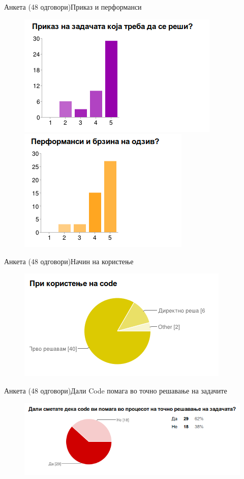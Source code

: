 \begin{frame}{Анкета (48 одговори)}{Приказ и перформанси}
\begin{figure}
    \centering
        \includegraphics[width=.45\textwidth]{images/responses/prikaz}
        \includegraphics[width=.45\textwidth]{images/responses/performance}
    \end{figure}
\end{frame}

\begin{frame}{Анкета (48 одговори)}{Начин на користење}
\begin{figure}
    \centering
        \includegraphics[width=.9\textwidth]{images/responses/ide_vs_code}
    \end{figure}
\end{frame}

\begin{frame}{Анкета (48 одговори)}{Дали Code помага во точно решавање на
задачите}
\begin{figure}
    \centering
        \includegraphics[width=.9\textwidth]{images/responses/is_Code_help}
    \end{figure}
\end{frame}

